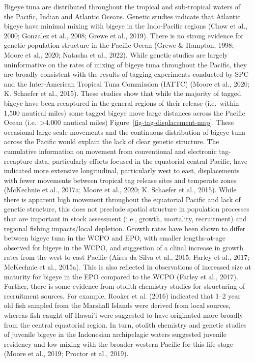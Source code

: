 \documentclass[
  english,
  a4paper,
  a4paper,
  11pt]{SCreport}
\begin{document}
Bigeye tuna are distributed throughout the tropical and sub-tropical
waters of the Pacific, Indian and Atlantic Oceans. Genetic studies
indicate that Atlantic bigeye have minimal mixing with bigeye in the
Indo-Pacific regions (Chow et al., 2000; Gonzalez et al., 2008; Grewe et
al., 2019). There is no strong evidence for genetic population structure
in the Pacific Ocean (Grewe \& Hampton, 1998; Moore et al., 2020;
Natasha et al., 2022). While genetic studies are largely uninformative
on the rates of mixing of bigeye tuna throughout the Pacific, they are
broadly consistent with the results of tagging experiments conducted by
SPC and the Inter-American Tropical Tuna Commission (IATTC) (Moore et
al., 2020; K. Schaefer et al., 2015). These studies show that while the
majority of tagged bigeye have been recaptured in the general regions of
their release (i.e.~within 1,500 nautical miles) some tagged bigeye move
large distances across the Pacific Ocean (i.e.~\textgreater4,000
nautical miles) Figure~\ref{fig-tag-displacement-map}. These occasional
large-scale movements and the continuous distribution of bigeye tuna
across the Pacific would explain the lack of clear genetic structure.
The cumulative information on movement from conventional and electronic
tag-recapture data, particularly efforts focused in the equatorial
central Pacific, have indicated more extensive longitudinal,
particularly west to east, displacements with fewer movements between
tropical tag release sites and temperate zones (McKechnie et al., 2017a;
Moore et al., 2020; K. Schaefer et al., 2015). While there is apparent
high movement throughout the equatorial Pacific and lack of genetic
structure, this does not preclude spatial structure in population
processes that are important in stock assessment (i.e., growth,
mortality, recruitment) and regional fishing impacts/local depletion.
Growth rates have been shown to differ between bigeye tuna in the WCPO
and EPO, with smaller lengths-at-age observed for bigeye in the WCPO,
and suggestion of a clinal increase in growth rates from the west to
east Pacific (Aires-da-Silva et al., 2015; Farley et al., 2017;
McKechnie et al., 2015a). This is also reflected in observations of
increased size at maturity for bigeye in the EPO compared to the WCPO
(Farley et al., 2017). Further, there is some evidence from otolith
chemistry studies for structuring of recruitment sources. For example,
Rooker et al. (2016) indicated that 1--2 year old fish sampled from the
Marshall Islands were derived from local sources, whereas fish caught
off Hawai'i were suggested to have originated more broadly from the
central equatorial region. In turn, otolith chemistry and genetic
studies of juvenile bigeye in the Indonesian archipelagic waters
suggested juvenile residency and low mixing with the broader western
Pacific for this life stage (Moore et al., 2019; Proctor et al., 2019).
\end{document}
